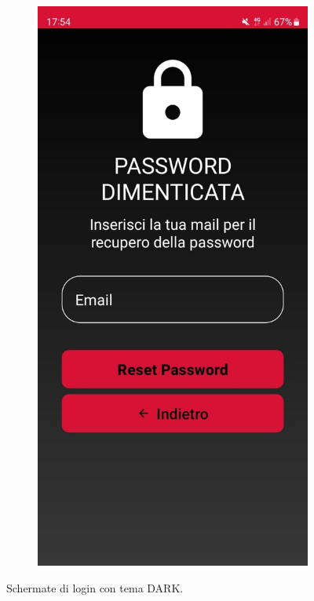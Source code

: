 \begin{figure}[ht]
\begin{subfigure}[b]{0.3\textwidth}
    \end{subfigure}
    \begin{subfigure}[b]{0.3\textwidth}
      \includegraphics[width=\textwidth, height=0.45\textheight]{Immagini/App/pw_dimenticata_scuro.jpeg}
    \end{subfigure}
    \caption{Schermate di login con tema DARK.}
    \label{fig:dark1}
\end{figure}


